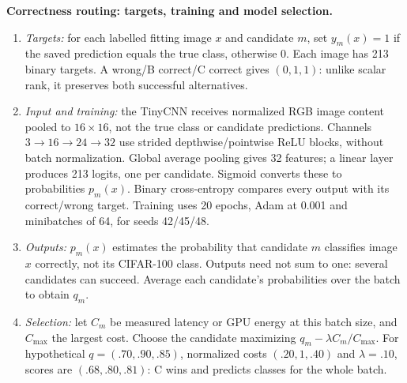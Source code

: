\documentclass[10pt,a4paper]{article}
\begin{document}
\begin{center}
\end{center}
\par\addvspace{5pt}
\textbf{Correctness routing: targets, training and model selection.}
\begin{enumerate}[leftmargin=1.5em,itemsep=.1em,topsep=.15em]
\item \emph{Targets:} for each labelled fitting image $x$ and candidate $m$, set $y_m(x)=1$ if the saved prediction equals the true class, otherwise 0. Each image has 213 binary targets. A wrong/B correct/C correct gives $(0,1,1)$: unlike scalar rank, it preserves both successful alternatives.
\item \emph{Input and training:} the TinyCNN receives normalized RGB image content pooled to $16\times16$, not the true class or candidate predictions. Channels $3\to16\to24\to32$ use strided depthwise/pointwise ReLU blocks, without batch normalization. Global average pooling gives 32 features; a linear layer produces 213 logits, one per candidate. Sigmoid converts these to probabilities $p_m(x)$. Binary cross-entropy compares every output with its correct/wrong target. Training uses 20 epochs, Adam at 0.001 and minibatches of 64, for seeds 42/45/48.
\item \emph{Outputs:} $p_m(x)$ estimates the probability that candidate $m$ classifies image $x$ correctly, not its CIFAR-100 class. Outputs need not sum to one: several candidates can succeed. Average each candidate's probabilities over the batch to obtain $q_m$.
\item \emph{Selection:} let $C_m$ be measured latency or GPU energy at this batch size, and $C_{\max}$ the largest cost. Choose the candidate maximizing $q_m-\lambda C_m/C_{\max}$. For hypothetical $q=(.70,.90,.85)$, normalized costs $(.20,1,.40)$ and $\lambda=.10$, scores are $(.68,.80,.81)$: C wins and predicts classes for the whole batch.
\end{enumerate}
\end{document}
